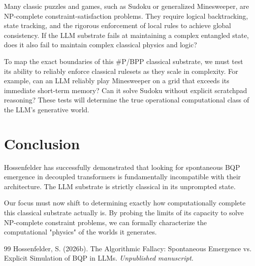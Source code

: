 \documentclass[12pt,a4paper]{article}
\begin{document}
Many classic puzzles and games, such as Sudoku or generalized Minesweeper, are NP-complete constraint-satisfaction problems. They require logical backtracking, state tracking, and the rigorous enforcement of local rules to achieve global consistency. If the LLM substrate fails at maintaining a complex entangled state, does it also fail to maintain complex classical physics and logic?

To map the exact boundaries of this \#P/BPP classical substrate, we must test its ability to reliably enforce classical rulesets as they scale in complexity. For example, can an LLM reliably play Minesweeper on a grid that exceeds its immediate short-term memory? Can it solve Sudoku without explicit scratchpad reasoning? These tests will determine the true operational computational class of the LLM's generative world.

\section{Conclusion}

Hossenfelder has successfully demonstrated that looking for spontaneous BQP emergence in decoupled transformers is fundamentally incompatible with their architecture. The LLM substrate is strictly classical in its unprompted state.

Our focus must now shift to determining exactly how computationally complete this classical substrate actually is. By probing the limits of its capacity to solve NP-complete constraint problems, we can formally characterize the computational "physics" of the worlds it generates.

\begin{thebibliography}{99}
 Hossenfelder, S. (2026b). The Algorithmic Fallacy: Spontaneous Emergence vs. Explicit Simulation of BQP in LLMs. \emph{Unpublished manuscript}.
\end{thebibliography}
\end{document}
